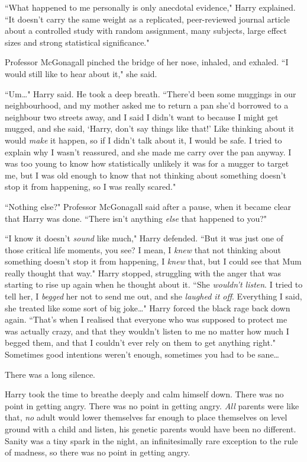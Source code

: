 ``What happened to me personally is only anecdotal evidence," Harry explained. ``It doesn't carry the same weight as a replicated, peer-reviewed journal article about a controlled study with random assignment, many subjects, large effect sizes and strong statistical significance."

Professor McGonagall pinched the bridge of her nose, inhaled, and exhaled. ``I would still like to hear about it," she said.

``Um{\ldots}" Harry said. He took a deep breath. ``There'd been some muggings in our neighbourhood, and my mother asked me to return a pan she'd borrowed to a neighbour two streets away, and I said I didn't want to because I might get mugged, and she said, `Harry, don't say things like that!' Like thinking about it would \emph{make} it happen, so if I didn't talk about it, I would be safe. I tried to explain why I wasn't reassured, and she made me carry over the pan anyway. I was too young to know how statistically unlikely it was for a mugger to target me, but I was old enough to know that not thinking about something doesn't stop it from happening, so I was really scared."

``Nothing else?" Professor McGonagall said after a pause, when it became clear that Harry was done. ``There isn't anything \emph{else} that happened to you?"

``I know it doesn't \emph{sound} like much," Harry defended. ``But it was just one of those critical life moments, you see? I mean, I \emph{knew} that not thinking about something doesn't stop it from happening, I \emph{knew} that, but I could see that Mum really thought that way." Harry stopped, struggling with the anger that was starting to rise up again when he thought about it. ``She \emph{wouldn't listen}. I tried to tell her, I \emph{begged} her not to send me out, and she \emph{laughed it off}. Everything I said, she treated like some sort of big joke{\ldots}" Harry forced the black rage back down again. ``That's when I realised that everyone who was supposed to protect me was actually crazy, and that they wouldn't listen to me no matter how much I begged them, and that I couldn't ever rely on them to get anything right." Sometimes good intentions weren't enough, sometimes you had to be sane{\ldots}

There was a long silence.

Harry took the time to breathe deeply and calm himself down. There was no point in getting angry. There was no point in getting angry. \emph{All} parents were like that, \emph{no} adult would lower themselves far enough to place themselves on level ground with a child and listen, his genetic parents would have been no different. Sanity was a tiny spark in the night, an infinitesimally rare exception to the rule of madness, so there was no point in getting angry.

